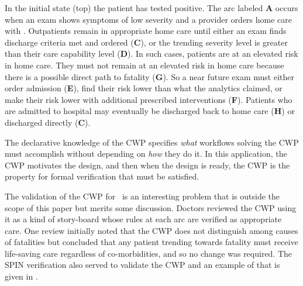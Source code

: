 In the initial state (top) the patient has tested positive. The arc labeled \textbf{A} occurs when an exam shows symptoms of low severity and a provider orders home care with \phware. Outpatients remain in appropriate home care until either an exam finds discharge criteria met and ordered (\textbf{C}), or the trending severity level is greater than their care capability level (\textbf{D}). In such cases, patients are at an elevated risk in home care. They must not remain at an elevated risk in home care because there is a possible direct path to fatality (\textbf{G}). So a near future exam must either order admission (\textbf{E}), find their risk lower than what the analytics claimed, or make their risk lower with additional prescribed interventions (\textbf{F}). Patients who are admitted to hospital may eventually be discharged back to home care (\textbf{H}) or discharged directly (\textbf{C}). 

The declarative knowledge of the CWP specifies \emph{what} workflows solving the CWP must accomplish without depending on \emph{how} they do it. In this application, the CWP motivates the design, and then when the design is ready, the CWP is the property for formal verification that must be satisfied. 

The validation of the CWP for \phware\ is an interesting problem that is outside the scope of this paper but merits some discussion. Doctors reviewed the CWP using it as a kind of story-board whose rules at each arc are verified as appropriate care. One review initially noted that the CWP does not distinguish among causes of fatalities but concluded that any patient trending towards fatality must receive life-saving care regardless of co-morbidities, and so no change was required. The SPIN verification also served to validate the CWP and an example of that is given in .

